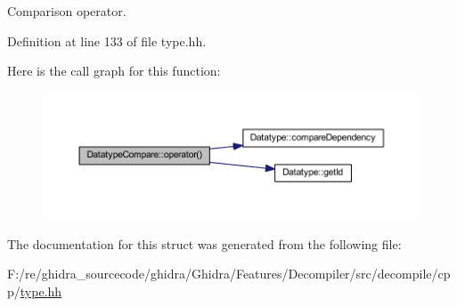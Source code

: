 Comparison operator. 



Definition at line 133 of file type.\+hh.

Here is the call graph for this function\+:
\nopagebreak
\begin{figure}[H]
\begin{center}
\leavevmode
\includegraphics[width=350pt]{struct_datatype_compare_a1e1552890e1e0ed8b1ec6dd93feb1648_cgraph}
\end{center}
\end{figure}


The documentation for this struct was generated from the following file\+:\begin{DoxyCompactItemize}
\item 
F\+:/re/ghidra\+\_\+sourcecode/ghidra/\+Ghidra/\+Features/\+Decompiler/src/decompile/cpp/\mbox{\hyperlink{type_8hh}{type.\+hh}}\end{DoxyCompactItemize}
